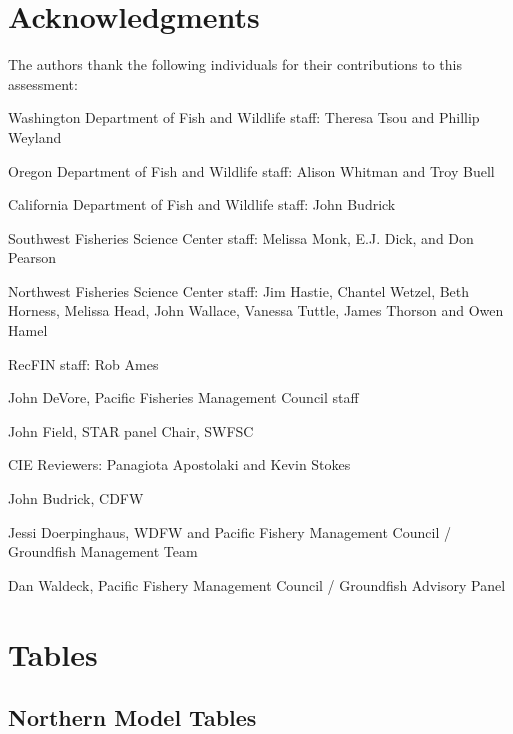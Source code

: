 \documentclass[12pt,]{article}
\begin{document}
\newpage

\section{Acknowledgments}\label{acknowledgments}

The authors thank the following individuals for their contributions to
this assessment:

Washington Department of Fish and Wildlife staff: Theresa Tsou and
Phillip Weyland

Oregon Department of Fish and Wildlife staff: Alison Whitman and Troy
Buell

California Department of Fish and Wildlife staff: John Budrick

Southwest Fisheries Science Center staff: Melissa Monk, E.J. Dick, and
Don Pearson

Northwest Fisheries Science Center staff: Jim Hastie, Chantel Wetzel,
Beth Horness, Melissa Head, John Wallace, Vanessa Tuttle, James Thorson
and Owen Hamel

RecFIN staff: Rob Ames

John DeVore, Pacific Fisheries Management Council staff

John Field, STAR panel Chair, SWFSC

CIE Reviewers: Panagiota Apostolaki and Kevin Stokes

John Budrick, CDFW

Jessi Doerpinghaus, WDFW and Pacific Fishery Management Council /
Groundfish Management Team

Dan Waldeck, Pacific Fishery Management Council / Groundfish Advisory
Panel

\newpage

\renewcommand{\thefigure}{\arabic{figure}}
\renewcommand{\thetable}{\arabic{table}}

\setcounter{figure}{0} \setcounter{table}{0} \newpage

\captionsetup[table]{labelformat=simple,format=plain,labelsep=period}

\section{Tables}\label{tables}

\subsection{Northern Model Tables}\label{northern-model-tables}
\end{document}
